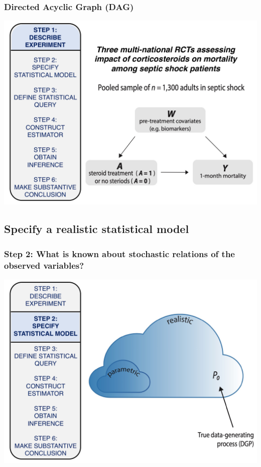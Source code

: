 \documentclass[t]{beamer}
\begin{document}
\begin{frame}
  \frametitle{Directed Acyclic Graph (DAG)}
  \vspace{-20pt}
  \begin{center}
  \includegraphics[width = 1.05\textwidth]{figures/DAG.pdf}
  \end{center}
\end{frame}

\subsection{Specify a realistic statistical model}

\begin{frame}
  \frametitle{Step 2: What is known about stochastic relations of the observed variables?}
  \vspace{-20pt}
  \begin{center}
  \includegraphics[width = 1.05\textwidth]{figures/roadmap2.pdf}
  \end{center}
\end{frame}
\end{document}
